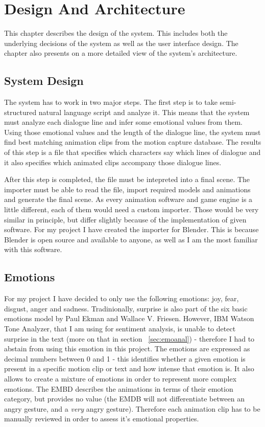 \chapter{Design And Architecture\label{chap:design}}

This chapter describes the design of the system. This includes both the underlying decisions of the system as well as the user interface design. The chapter also presents on a more detailed view of the system's architecture.

\section{System Design}

The system has to work in two major steps. The first step is to take semi-structured natural language script and analyze it. This means that the system must analyze each dialogue line and infer some emotional values from them. Using those emotional values and the length of the dialogue line, the system must find best matching animation clips from the motion capture database. The results of this step is a file that specifies which characters say which lines of dialogue and it also specifies which animated clips accompany those dialogue lines.

After this step is completed, the file must be intepreted into a final scene. The importer must be able to read the file, import required models and animations and generate the final scene. As every animation software and game engine is a little different, each of them would need a custom importer. Those would be very similar in principle, but differ slightly because of the implementation of given software. For my project I have created the importer for Blender. This is because Blender is open source and available to anyone, as well as I am the most familiar with this software.


\section{Emotions}

For my project I have decided to only use the following emotions: joy, fear, disgust, anger and sadness. Tradinionally, surprise is also part of the six basic emotions model by Paul Ekman and Wallace V. Friesen. However, IBM Watson Tone Analyzer, that I am using for sentiment analysis, is unable to detect surprise in the text (more on that in section ~\ref{sec:emoanal}) - therefore I had to abstain from using this emotion in this project. The emotions are expressed as decimal numbers between 0 and 1 - this identifies whether a given emotion is present in a specific motion clip or text and how intense that emotion is. It also allows to create a mixture of emotions in order to represent more complex emotions. The EMBD describes the animations in terms of their emotion category, but provides no value (the EMDB will not differentiate between an angry gesture, and a \textit{very} angry gesture). Therefore each animation clip has to be manually reviewed in order to assess it's emotional properties.

